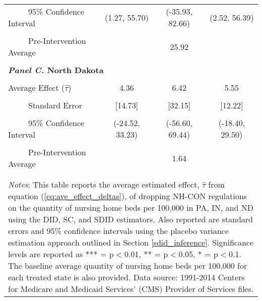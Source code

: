 \documentclass[../Main.tex]{subfiles}
\begin{document}
\begin{table}[htbp]
\begin{tabular}{l*{3}{c}}
\multicolumn{1}{l}{\ \ \ \ \ 95\% Confidence Interval}&   \multicolumn{1}{c}{(1.27, 55.70)}&   \multicolumn{1}{c}{(-35.93, 82.66)}&   \multicolumn{1}{c}{(2.52, 56.39)}\\
\\[-2ex]
\multicolumn{1}{l}{\ \ \ \ \ Pre-Intervention Average}&   \multicolumn{3}{c}{25.92}\\
\\[-.1ex]
\multicolumn{4}{l}{\textbf{\textit{Panel C.} North Dakota}}\\
\\[-1.5ex]
\multicolumn{1}{l}{Average Effect ($\hat{\tau}$)}&   \multicolumn{1}{c}{4.36}&   \multicolumn{1}{c}{6.42}&  \multicolumn{1}{c}{5.55}\\
\\[-2ex]
\multicolumn{1}{l}{\ \ \ \ \ Standard Error}  &\multicolumn{1}{c}{[14.73]}&\multicolumn{1}{c}{[32.15]}&\multicolumn{1}{c}{[12.22]}\\
\\[-2ex]
\multicolumn{1}{l}{\ \ \ \ \ 95\% Confidence Interval}&   \multicolumn{1}{c}{(-24.52, 33.23)}&   \multicolumn{1}{c}{(-56.60, 69.44)}&   \multicolumn{1}{c}{(-18.40, 29.50)}\\
\\[-2ex]
\multicolumn{1}{l}{\ \ \ \ \ Pre-Intervention Average}&   \multicolumn{3}{c}{1.64}\\
\\[-.1ex]
\hline\hline
\\[-2ex]
\multicolumn{4}{p{.75\linewidth}}{\footnotesize \textit{Notes}: This table reports the average estimated effect, $\hat{\tau}$ from equation (\ref{eq:ave_effect_deltas}), of dropping NH-CON regulations on the quantity of nursing home beds per 100,000 in PA, IN, and ND using the DID, SC, and SDID estimators. Also reported are standard errors and 95\% confidence intervals using the placebo variance estimation approach outlined in Section \ref{sdid_inference}. Significance levels are reported as *** = p$<$0.01, ** = p$<$0.05, * = p$<$0.1. The baseline average quantity of nursing home beds per 100,000 for each treated state is also provided. Data source: 1991-2014 Centers for Medicare and Medicaid Services’ (CMS) Provider of Services files.}
\end{tabular}
\end{table}
\vfill
\clearpage
\end{document}
